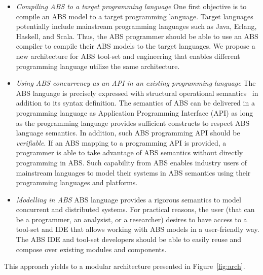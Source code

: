 \begin{itemize}
\item \emph{Compiling ABS to a target programming language}
One first objective is to compile an ABS model to a target programming language.
Target languages potentially include mainstream programming languages such as
Java, Erlang, Haskell, and Scala.
Thus, the ABS programmer should be able to use an ABS compiler to compile
their ABS models to the target languages.
We propose a new architecture for ABS tool-set and engineering that enables
different programming language utilize the same architecture.
\item \emph{Using ABS concurrency as an API in an existing programming language}
The ABS language is precisely expressed with structural operational semantics~\cite{johnsen2012abs} in addition to its syntax definition.
The semantics of ABS can be delivered in a programming language
as Application Programming Interface (API) as long as the programming language provides sufficient constructs to respect ABS language semantics.
In addition, such ABS programming API should be \emph{verifiable}.
If an ABS mapping to a programming API is provided, a programmer is able to
take advantage of ABS semantics without directly programming in ABS.
Such capability from ABS enables industry users of mainstream languages to
model their systems in ABS semantics using their programming languages and
platforms.
\item \emph{Modelling in ABS}
ABS language provides a rigorous semantics to model concurrent
and distributed systems.
For practical reasons, the user (that can be a programmer, an analysist, or a researcher) 
desires to have access to a tool-set and IDE that allows working with ABS 
models in a user-friendly way.
The ABS IDE and tool-set developers should be able to easily reuse and compose
over existing modules and components.
\end{itemize}

This approach yields to a modular architecture presented in 
Figure~\ref{fig:arch}.


